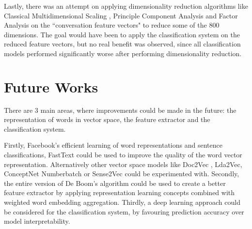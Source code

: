 \documentclass[11pt]{article}
\begin{document}
Lastly, there was an attempt on applying dimensionality reduction algorithms like Classical Multidimensional Scaling \cite{borg2005modern}, Principle Component Analysis and Factor Analysis \cite{jolliffe1986principal} on the ``conversation feature vectors" to reduce some of the 800 dimensions. The goal would have been to apply the classification system on the reduced feature vectors, but no real benefit was observed, since all classification models performed significantly worse after performing dimensionality reduction.  

\section{Future Works}
There are 3 main areas, where improvements could be made in the future: the representation of words in vector space, the feature extractor and the classification system. 

Firstly, Facebook's efficient learning of word representations and sentence classifications, FastText \cite{joulin2016bag} could be used to improve the quality of the word vector representation. Alternatively other vector space models like Doc2Vec \cite{le2014distributed}, Lda2Vec\cite{moody2016mixing}, ConceptNet Numberbatch \cite{speer2017conceptnet} or Sense2Vec \cite{trask2015sense2vec} could be experimented with. Secondly, the entire version of De Boom's algorithm \cite{de2016representation} could be used to create a better feature extractor by applying representation learning concepts combined with weighted word embedding aggregation. Thirdly, a deep learning approach could be considered for the classification system, by favouring prediction accuracy over model interpretability. 
\end{document}
